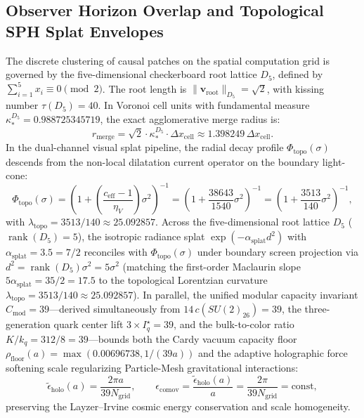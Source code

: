 \documentclass[11pt,letterpaper]{article}
\theoremstyle{plain}
\begin{document}
\subsection{Observer Horizon Overlap and Topological SPH Splat Envelopes}
\label{sec:observer-horizon-overlap-sph}

The discrete clustering of causal patches on the spatial computation grid is governed by the five-dimensional checkerboard root lattice $D_5$, defined by $\sum_{i=1}^5 x_i \equiv 0 \pmod 2$. The root length is $\|\mathbf{v}_{\mathrm{root}}\|_{D_5} = \sqrt{2}$, with kissing number $\tau(D_5) = 40$. In Voronoi cell units with fundamental measure $\kappa_*^{D_5} = 0.988725345719$, the exact agglomerative merge radius is:
\begin{equation}
    r_{\mathrm{merge}} = \sqrt{2} \cdot \kappa_*^{D_5} \cdot \Delta x_{\mathrm{cell}} \approx 1.398249 \, \Delta x_{\mathrm{cell}}.
\end{equation}
In the dual-channel visual splat pipeline, the radial decay profile $\Phi_{\mathrm{topo}}(\sigma)$ descends from the non-local dilatation current operator on the boundary light-cone:
\begin{equation}
    \Phi_{\mathrm{topo}}(\sigma) = \left( 1 + \left(\frac{c_{\mathrm{eff}} - 1}{\eta_V}\right) \sigma^2 \right)^{-1} = \left( 1 + \frac{38643}{1540} \sigma^2 \right)^{-1} = \left( 1 + \frac{3513}{140} \sigma^2 \right)^{-1},
\end{equation}
with $\lambda_{\mathrm{topo}} = 3513 / 140 \approx 25.092857$. Across the five-dimensional root lattice $D_5$ ($\operatorname{rank}(D_5) = 5$), the isotropic radiance splat $\exp(-\alpha_{\mathrm{splat}} d^2)$ with $\alpha_{\mathrm{splat}} = 3.5 = 7/2$ reconciles with $\Phi_{\mathrm{topo}}(\sigma)$ under boundary screen projection via $d^2 = \operatorname{rank}(D_5)\sigma^2 = 5\sigma^2$ (matching the first-order Maclaurin slope $5\alpha_{\mathrm{splat}} = 35/2 = 17.5$ to the topological Lorentzian curvature $\lambda_{\mathrm{topo}} = 3513/140 \approx 25.092857$). In parallel, the unified modular capacity invariant $C_{\mathrm{mod}} = 39$---derived simultaneously from $14\,c(SU(2)_{26}) = 39$, the three-generation quark center lift $3\times I_q^\star = 39$, and the bulk-to-color ratio $K/k_q = 312/8 = 39$---bounds both the Cardy vacuum capacity floor $\rho_{\mathrm{floor}}(a) = \max(0.00696738, 1/(39a))$ and the adaptive holographic force softening scale regularizing Particle-Mesh gravitational interactions:
\begin{equation}
    \tilde{\epsilon}_{\mathrm{holo}}(a) = \frac{2\pi a}{39 N_{\mathrm{grid}}}, \qquad \epsilon_{\mathrm{comov}} = \frac{\tilde{\epsilon}_{\mathrm{holo}}(a)}{a} = \frac{2\pi}{39 N_{\mathrm{grid}}} = \text{const},
\end{equation}
preserving the Layzer--Irvine cosmic energy conservation and scale homogeneity.
\end{document}
